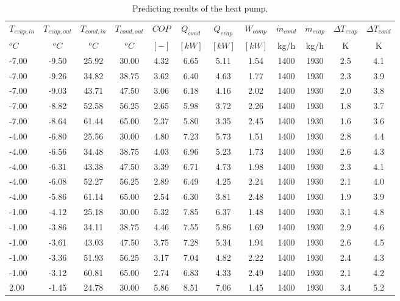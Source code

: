 \documentclass[english]{SPFShortReport}
\begin{document}
\begin{table}[!ht]
\begin{small}
\caption{Predicting results of the heat pump.}
\begin{center}
\resizebox{12cm}{!} 
{
\begin{tabular}{l | c c c c c c c c c c c } 
\hline
\hline
$T_{evap,in}$ &$T_{evap,out}$ &$T_{cond,in}$ &$T_{cond,out}$ &$COP$ &$Q_{cond}$ &$Q_{evap}$ &$W_{comp}$ &$\dot m_{cond}$ &$\dot m_{evap}$ &$\Delta T_{evap}$ &$\Delta T_{cond}$ \\ 
$^oC$ &$^oC$ &$^oC$ &$^oC$ &$[-]$ &$[kW]$ &$[kW]$ &$[kW]$ &kg/h &kg/h &K &K\\ 
\hline
-7.00 & -9.50 & 25.92 & 30.00 & 4.32 & 6.65 & 5.11 & 1.54 & 1400 & 1930 & 2.5 & 4.1\\ 
-7.00 & -9.26 & 34.82 & 38.75 & 3.62 & 6.40 & 4.63 & 1.77 & 1400 & 1930 & 2.3 & 3.9\\ 
-7.00 & -9.03 & 43.71 & 47.50 & 3.06 & 6.18 & 4.16 & 2.02 & 1400 & 1930 & 2.0 & 3.8\\ 
-7.00 & -8.82 & 52.58 & 56.25 & 2.65 & 5.98 & 3.72 & 2.26 & 1400 & 1930 & 1.8 & 3.7\\ 
-7.00 & -8.64 & 61.44 & 65.00 & 2.37 & 5.80 & 3.35 & 2.45 & 1400 & 1930 & 1.6 & 3.6\\ 
-4.00 & -6.80 & 25.56 & 30.00 & 4.80 & 7.23 & 5.73 & 1.51 & 1400 & 1930 & 2.8 & 4.4\\ 
-4.00 & -6.56 & 34.48 & 38.75 & 4.03 & 6.96 & 5.23 & 1.73 & 1400 & 1930 & 2.6 & 4.3\\ 
-4.00 & -6.31 & 43.38 & 47.50 & 3.39 & 6.71 & 4.73 & 1.98 & 1400 & 1930 & 2.3 & 4.1\\ 
-4.00 & -6.08 & 52.27 & 56.25 & 2.89 & 6.49 & 4.25 & 2.24 & 1400 & 1930 & 2.1 & 4.0\\ 
-4.00 & -5.86 & 61.14 & 65.00 & 2.54 & 6.30 & 3.81 & 2.48 & 1400 & 1930 & 1.9 & 3.9\\ 
-1.00 & -4.12 & 25.18 & 30.00 & 5.32 & 7.85 & 6.37 & 1.48 & 1400 & 1930 & 3.1 & 4.8\\ 
-1.00 & -3.86 & 34.11 & 38.75 & 4.46 & 7.55 & 5.86 & 1.69 & 1400 & 1930 & 2.9 & 4.6\\ 
-1.00 & -3.61 & 43.03 & 47.50 & 3.75 & 7.28 & 5.34 & 1.94 & 1400 & 1930 & 2.6 & 4.5\\ 
-1.00 & -3.36 & 51.93 & 56.25 & 3.17 & 7.04 & 4.82 & 2.22 & 1400 & 1930 & 2.4 & 4.3\\ 
-1.00 & -3.12 & 60.81 & 65.00 & 2.74 & 6.83 & 4.33 & 2.49 & 1400 & 1930 & 2.1 & 4.2\\ 
2.00 & -1.45 & 24.78 & 30.00 & 5.86 & 8.51 & 7.06 & 1.45 & 1400 & 1930 & 3.4 & 5.2\\ 

\end{tabular}}
\end{center}
\end{small}
\end{table}
\end{document}
